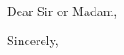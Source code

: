 \documentclass{template/cover}
\begin{document}
 
\begin{letter}{\theCompany\\ \theCompanyAddress}
  \opening{Dear Sir or Madam,}
    
  \closing{Sincerely,}
\end{letter}
\end{document}
